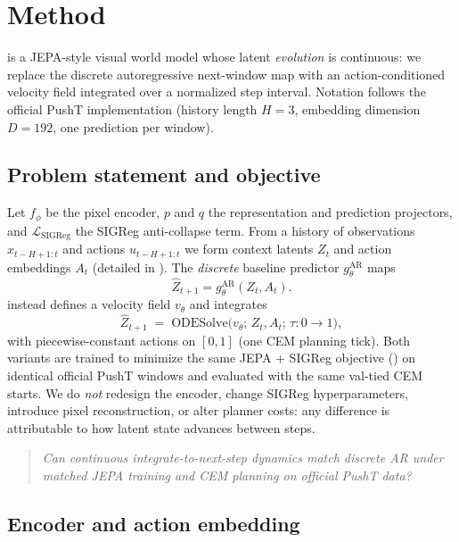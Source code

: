 \section{Method}
\label{sec:method}

\method{} is a JEPA-style visual world model whose latent \emph{evolution}
is continuous: we replace the discrete autoregressive next-window map with
an action-conditioned velocity field integrated over a normalized step
interval.
Notation follows the official PushT implementation (history length
$H{=}3$, embedding dimension $D{=}192$, one prediction per window).

\subsection{Problem statement and objective}
\label{sec:problem}

Let $f_\phi$ be the pixel encoder, $p$ and $q$ the representation and
prediction projectors, and $\mathcal{L}_{\mathrm{SIGReg}}$ the SIGReg
anti-collapse term.
From a history of observations $x_{t-H+1:t}$ and actions $u_{t-H+1:t}$ we
form context latents $Z_t$ and action embeddings $A_t$ (detailed in
).
The \emph{discrete} baseline predictor $g^{\mathrm{AR}}_\theta$ maps
\begin{equation}
  \hat Z_{t+1} = g^{\mathrm{AR}}_\theta(Z_t, A_t).
  \label{eq:prob-ar}
\end{equation}
\method{} instead defines a velocity field $v_\theta$ and integrates
\begin{equation}
  \hat Z_{t+1}
  \;=\;
  \mathrm{ODESolve}\bigl(v_\theta;\, Z_t, A_t;\, \tau{:}0\to 1\bigr),
  \label{eq:prob-ode}
\end{equation}
with piecewise-constant actions on $[0,1]$ (one CEM planning tick).
Both variants are trained to minimize the same JEPA + SIGReg objective
() on identical official PushT windows and evaluated with
the same val-tied CEM starts.
We do \emph{not} redesign the encoder, change SIGReg hyperparameters,
introduce pixel reconstruction, or alter planner costs: any difference is
attributable to how latent state advances between steps.

\begin{quote}
\emph{Can continuous integrate-to-next-step dynamics match discrete AR
under matched JEPA training and CEM planning on official PushT data?}
\end{quote}

\subsection{Encoder and action embedding}
\label{sec:encoder}

